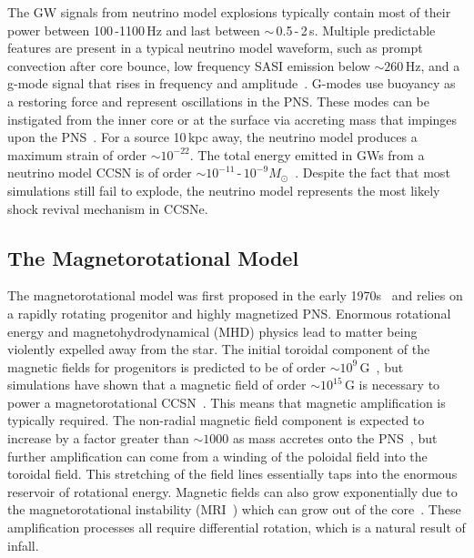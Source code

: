 The GW signals from neutrino model explosions typically contain most of their power between 100\,-1100\,Hz and last between $\sim$\,0.5\,-\,2\,s. Multiple predictable features are present in a typical neutrino model waveform, such as prompt convection after core bounce, low frequency SASI emission below $\sim260$\,Hz, and a g-mode signal that rises in frequency and amplitude~\cite{andresen:16, kuroda:16, 2017arXiv170107325Y}. G-modes use buoyancy as a restoring force and represent oscillations in the PNS. These modes can be instigated from the inner core or at the surface via accreting mass that impinges upon the PNS~\cite{andresen:16, kuroda:16, 2017arXiv170107325Y}. For a source 10\,kpc away, the neutrino model produces a maximum strain of order $\sim10^{-22}$. The total energy emitted in GWs from a neutrino model CCSN is of order $\sim10^{-11}$\,-\,$10^{-9}M_\odot$~\cite{thesis_jade, thesis_josh}. Despite the fact that most simulations still fail to explode, the neutrino model represents the most likely shock revival mechanism in CCSNe.

\subsection{The Magnetorotational Model}

The magnetorotational model was first proposed in the early 1970s~\cite{bisnovatyi1970explosion, ostriker1971pulsars, meier1976magnetohydrodynamic, bisnovatyi1976magnetohydrodynamic} and relies on a rapidly rotating progenitor and highly magnetized PNS. Enormous rotational energy and magnetohydrodynamical (MHD) physics lead to matter being violently expelled away from the star. The initial toroidal component of the magnetic fields for progenitors is predicted to be of order $\sim10^{9}$\,G~\cite{heger2005presupernova}, but simulations have shown that a magnetic field of order $\sim10^{15}$\,G is necessary to power a magnetorotational CCSN~\cite{burrows2007simulations}. This means that magnetic amplification is typically required. The non-radial magnetic field component is expected to increase by a factor greater than $\sim1000$ as mass accretes onto the PNS~\cite{janka}, but further amplification can come from a winding of the poloidal field into the toroidal field. This stretching of the field lines essentially taps into the enormous reservoir of rotational energy. Magnetic fields can also grow exponentially due to the magnetorotational instability (MRI~\cite{balbus1998instability, akiyama2003magnetorotational}) which can grow out of the core~\cite{obergaulinger2009semi}. These amplification processes all require differential rotation, which is a natural result of infall. 

